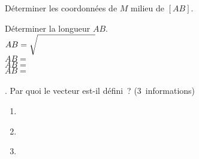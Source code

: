 \question Déterminer les coordonnées de $M$ milieu de $[AB]$.\\[1em]
\question Déterminer la longueur $AB$.\\[1em]
$AB = \sqrt{\parbox[c][2em][c]{0.2\textwidth}~}$\\[1em]
$AB = $\\[1em]
$AB = $\\[1em]
$AB = $\\[1em]																\\
.\dotfill
\question Par quoi le vecteur  est-il défini~?  (3~informations)\\
\begin{enumerate}
	\item ~\\
	\item ~\\
	\item ~\\	
\end{enumerate}